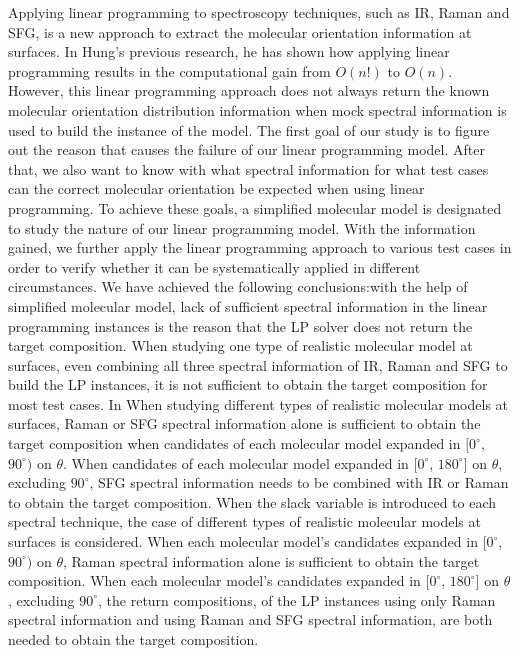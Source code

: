 Applying linear programming to spectroscopy techniques, such as IR, Raman and SFG, is a new approach to extract the molecular orientation information at surfaces. In Hung's previous research, he has shown how applying linear programming results in the computational gain from $O(n!)$ to $O(n)$. However, this linear programming approach does not always return the known molecular orientation distribution information when mock spectral information is used to build the instance of the model. The first goal of our study is to figure out the reason that causes the failure of our linear programming model. After that, we also want to know with what spectral information for what test cases can the correct molecular orientation be expected when using linear programming. To achieve these goals, a simplified molecular model is designated to study the nature of our linear programming model. With the information gained, we further apply the linear programming approach to various test cases in order to verify whether it can be systematically applied in different circumstances. We have achieved the following conclusions:with the help of simplified molecular model, lack of sufficient spectral information in the linear programming instances is the reason that the LP solver does not return the target composition. When studying one type of realistic molecular model at surfaces, even combining all three spectral information of IR, Raman and SFG to build the LP instances, it is not sufficient to obtain the target composition for most test cases. In When studying different types of realistic molecular models at surfaces, Raman or SFG spectral information alone is sufficient to obtain the target composition when candidates of each molecular model expanded in $[0^{\circ}$, $90^{\circ})$ on $\theta$. When candidates of each molecular model expanded in $[0^{\circ}$, $180^{\circ}]$ on $\theta$, excluding $90^{\circ}$, SFG spectral information needs to be combined with IR or Raman to obtain the target composition. When the slack variable is introduced to each spectral technique, the case of different types of realistic molecular models at surfaces is considered. When each molecular model's candidates expanded in $[0^{\circ}$, $90^{\circ})$ on $\theta$, Raman spectral information alone is sufficient to obtain the target composition. When each molecular model's candidates expanded in $[0^{\circ}$, $180^{\circ}]$ on $\theta$, excluding $90^{\circ}$, the return compositions, of the LP instances using only Raman spectral information and using Raman and SFG spectral information, are both needed to obtain the target composition.
